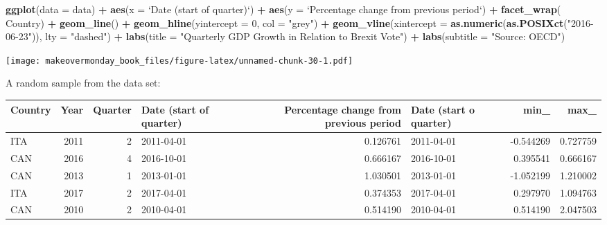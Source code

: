 \documentclass[]{book}
\newenvironment{Shaded}{\begin{snugshade}}{\end{snugshade}}
\newcommand{\KeywordTok}[1]{\textcolor[rgb]{0.13,0.29,0.53}{\textbf{#1}}}
\newcommand{\DataTypeTok}[1]{\textcolor[rgb]{0.13,0.29,0.53}{#1}}
\newcommand{\DecValTok}[1]{\textcolor[rgb]{0.00,0.00,0.81}{#1}}
\newcommand{\StringTok}[1]{\textcolor[rgb]{0.31,0.60,0.02}{#1}}
\newcommand{\OperatorTok}[1]{\textcolor[rgb]{0.81,0.36,0.00}{\textbf{#1}}}
\newcommand{\NormalTok}[1]{#1}
\theoremstyle{definition}
\theoremstyle{definition}
\theoremstyle{definition}
\theoremstyle{remark}
\begin{document}
\begin{Shaded}
\begin{Highlighting}[]
\KeywordTok{ggplot}\NormalTok{(}\DataTypeTok{data =}\NormalTok{ data) }\OperatorTok{+}
\StringTok{  }\KeywordTok{aes}\NormalTok{(}\DataTypeTok{x =} \StringTok{`}\DataTypeTok{Date (start of quarter)}\StringTok{`}\NormalTok{) }\OperatorTok{+}
\StringTok{  }\KeywordTok{aes}\NormalTok{(}\DataTypeTok{y =} \StringTok{`}\DataTypeTok{Percentage change from previous period}\StringTok{`}\NormalTok{) }\OperatorTok{+}
\StringTok{  }\KeywordTok{facet_wrap}\NormalTok{(}\OperatorTok{~}\StringTok{ }\NormalTok{Country) }\OperatorTok{+}
\StringTok{  }\KeywordTok{geom_line}\NormalTok{() }\OperatorTok{+}
\StringTok{  }\KeywordTok{geom_hline}\NormalTok{(}\DataTypeTok{yintercept =} \DecValTok{0}\NormalTok{, }\DataTypeTok{col =} \StringTok{"grey"}\NormalTok{) }\OperatorTok{+}
\StringTok{  }\KeywordTok{geom_vline}\NormalTok{(}\DataTypeTok{xintercept =} \KeywordTok{as.numeric}\NormalTok{(}\KeywordTok{as.POSIXct}\NormalTok{(}\StringTok{"2016-06-23"}\NormalTok{)), }\DataTypeTok{lty =} \StringTok{"dashed"}\NormalTok{) }\OperatorTok{+}
\StringTok{  }\KeywordTok{labs}\NormalTok{(}\DataTypeTok{title =} \StringTok{"Quarterly GDP Growth in Relation to Brexit Vote"}\NormalTok{) }\OperatorTok{+}
\StringTok{  }\KeywordTok{labs}\NormalTok{(}\DataTypeTok{subtitle =} \StringTok{"Source: OECD"}\NormalTok{)}
\end{Highlighting}
\end{Shaded}

\texttt{[image: makeovermonday\_book\_files/figure-latex/unnamed-chunk-30-1.pdf]}

A random sample from the data set:

\begin{tabular}{l|r|r|l|r|l|r|r}
\hline
Country & Year & Quarter & Date (start of quarter) & Percentage change from previous period & Date (start o quarter) & min\_ & max\_\\
\hline
ITA & 2011 & 2 & 2011-04-01 & 0.126761 & 2011-04-01 & -0.544269 & 0.727759\\
\hline
CAN & 2016 & 4 & 2016-10-01 & 0.666167 & 2016-10-01 & 0.395541 & 0.666167\\
\hline
CAN & 2013 & 1 & 2013-01-01 & 1.030501 & 2013-01-01 & -1.052199 & 1.210002\\
\hline
ITA & 2017 & 2 & 2017-04-01 & 0.374353 & 2017-04-01 & 0.297970 & 1.094763\\
\hline
CAN & 2010 & 2 & 2010-04-01 & 0.514190 & 2010-04-01 & 0.514190 & 2.047503\\
\hline
\end{tabular}
\end{document}
